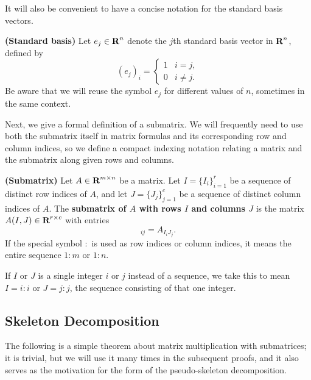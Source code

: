\documentclass{article}
\begin{document}
	It will also be convenient to have a concise notation for the standard basis vectors.
	
	\begin{dfn} \textnormal{\bf(Standard basis)}
		\label{def:standard_basis}
		Let $e_j \in \textnormal{\bf R}^n$ denote the $j$th standard basis vector in $\textnormal{\bf R}^n$, defined by
		\begin{equation}
			(e_j)_i = \begin{cases}
				1 & i = j, \\
				0 & i \ne j.
			\end{cases}
		\end{equation}
		Be aware that we will reuse the symbol $e_j$ for different values of $n$, sometimes in the same context.
	\end{dfn}
	
	Next, we give a formal definition of a submatrix. We will frequently need to use both the submatrix itself in matrix formulas and its corresponding row and column indices, so we define a compact indexing notation relating a matrix and the submatrix along given rows and columns.
	
	\begin{dfn} \textnormal{\bf(Submatrix)}
		\label{def:submatrix}
		Let $A \in \textnormal{\bf R}^{m\times n}$ be a matrix. Let $I = \{I_i\}_{i=1}^r$ be a sequence of distinct row indices of $A$, and let $J = \{J_j\}_{j=1}^c$ be a sequence of distinct column indices of $A$. The \textbf{submatrix of $A$ with rows $I$ and columns $J$} is the matrix $A(I,J) \in \textnormal{\bf R}^{r\times c}$ with entries
		\begin{equation}
			[A(I,J)]_{ij} = A_{I_iJ_j}.
		\end{equation}
		If the special symbol $:$ is used as row indices or column indices, it means the entire sequence $1:m$ or $1:n$.
		
		If $I$ or $J$ is a single integer $i$ or $j$ instead of a sequence, we take this to mean $I = i:i$ or $J = j:j$, the sequence consisting of that one integer.
	\end{dfn}
	
	\subsection{Skeleton Decomposition}
	
	The following is a simple theorem about matrix multiplication with submatrices; it is trivial, but we will use it many times in the subsequent proofs, and it also serves as the motivation for the form of the pseudo-skeleton decomposition.
	
\end{document}
